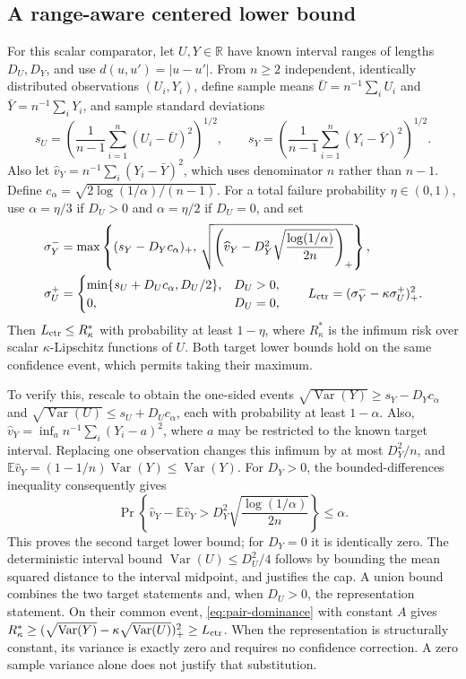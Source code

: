 \subsection{A range-aware centered lower bound}
\label{app:centered-range-aware}

For this scalar comparator, let $U,Y\in\mathbb R$ have known interval
ranges of lengths $D_U,D_Y$, and use $d(u,u')=|u-u'|$.
From $n\geq2$ independent, identically distributed observations
$(U_i,Y_i)$, define sample means $\bar U=n^{-1}\sum_iU_i$ and
$\bar Y=n^{-1}\sum_iY_i$, and sample standard deviations
\[
 s_U=\left(\frac{1}{n-1}\sum_{i=1}^n(U_i-\bar U)^2\right)^{1/2},
 \qquad
 s_Y=\left(\frac{1}{n-1}\sum_{i=1}^n(Y_i-\bar Y)^2\right)^{1/2}.
\]
Also let $\widehat v_Y=n^{-1}\sum_i(Y_i-\bar Y)^2$, which uses denominator
$n$ rather than $n-1$. Define
$c_\alpha=\sqrt{2\log(1/\alpha)/(n-1)}$.
For a total failure probability $\eta\in(0,1)$, use
$\alpha=\eta/3$ if $D_U>0$ and $\alpha=\eta/2$ if $D_U=0$, and set
\begin{align}
 \sigma_Y^-&=\max\left\{(s_Y-D_Yc_\alpha)_+,\,
 \sqrt{\left(\widehat v_Y-D_Y^2
                    \sqrt{\frac{\log(1/\alpha)}{2n}}\right)_+}\right\},
 \nonumber\\
 \sigma_U^+&=
 \begin{cases}
   \min\{s_U+D_Uc_\alpha,D_U/2\},&D_U>0,\\
   0,&D_U=0,
 \end{cases}
 \qquad
 L_{\rm ctr}=(\sigma_Y^--\kappa\sigma_U^+)_+^2.
 \label{eq:range-aware-centered}
\end{align}
Then $L_{\rm ctr}\leq R^*_\kappa$ with probability at least $1-\eta$,
where $R^*_\kappa$ is the infimum risk over scalar $\kappa$-Lipschitz
functions of $U$. Both target lower bounds hold on the same confidence
event, which permits taking their maximum.

To verify this, rescale \citet[Theorem~10]{maurer2009empirical} to obtain
the one-sided events
$\sqrt{\operatorname{Var}(Y)}\geq s_Y-D_Yc_\alpha$ and
$\sqrt{\operatorname{Var}(U)}\leq s_U+D_Uc_\alpha$, each with probability
at least $1-\alpha$. Also, $\widehat v_Y=\inf_a n^{-1}\sum_i(Y_i-a)^2$, where $a$ may be
restricted to the known target interval. Replacing one observation changes
this infimum by at most $D_Y^2/n$, and
$\mathbb E\widehat v_Y=(1-1/n)\operatorname{Var}(Y)
\leq\operatorname{Var}(Y)$.
For $D_Y>0$, the bounded-differences inequality consequently gives
\[
 \Pr\!\left\{\widehat v_Y-\mathbb E\widehat v_Y>
          D_Y^2\sqrt{\frac{\log(1/\alpha)}{2n}}\right\}\leq\alpha.
\]
This proves the second target lower bound; for $D_Y=0$ it is identically
zero. The deterministic interval bound
$\operatorname{Var}(U)\leq D_U^2/4$ follows by bounding the mean squared
distance to the interval midpoint, and justifies the cap. A union bound
combines the two target statements and, when $D_U>0$, the representation
statement. On their common event, \eqref{eq:pair-dominance} with constant
$A$ gives
$R^*_\kappa\geq
(\sqrt{\operatorname{Var}(Y)}-\kappa\sqrt{\operatorname{Var}(U)})_+^2
\geq L_{\rm ctr}$. When the representation is structurally constant, its
variance
is exactly zero and requires no confidence correction. A zero sample variance
alone does not justify that substitution.

